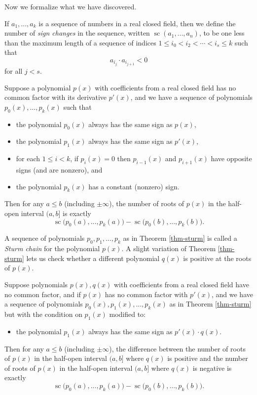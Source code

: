 Now we formalize what we have discovered.

\begin{defn} If $a_1, ..., a_k$ is a sequence of numbers in a real closed field, then we define the number of \emph{sign changes} in the sequence, written $\operatorname{sc}(a_1, ..., a_n)$, to be one less than the maximum length of a sequence of indices $1 \le i_0 < i_2 < \cdots < i_s \le k$ such that
\[
a_{i_j} \cdot a_{i_{j+1}} < 0
\]
for all $j < s$.
\end{defn}

\begin{thm}[Sturm]\label{thm-sturm} Suppose a polynomial $p(x)$ with coefficients from a real closed field has no common factor with its derivative $p'(x)$, and we have a sequence of polynomials $p_0(x), ..., p_k(x)$ such that
\begin{itemize}
\item the polynomial $p_0(x)$ always has the same sign as $p(x)$,

\item the polynomial $p_1(x)$ always has the same sign as $p'(x)$,

\item for each $1 \le i < k$, if $p_i(x) = 0$ then $p_{i-1}(x)$ and $p_{i+1}(x)$ have opposite signs (and are nonzero), and

\item the polynomial $p_k(x)$ has a constant (nonzero) sign.
\end{itemize}
Then for any $a \le b$ (including $\pm\infty$), the number of roots of $p(x)$ in the half-open interval $(a,b]$ is exactly
\[
\operatorname{sc}\big(p_0(a), ..., p_k(a)\big) - \operatorname{sc}\big(p_0(b), ..., p_k(b)\big).
\]
\end{thm}

A sequence of polynomials $p_0, p_1, ..., p_k$ as in Theorem \ref{thm-sturm} is called a \emph{Sturm chain} for the polynomial $p(x)$. A slight variation of Theorem \ref{thm-sturm} lets us check whether a different polynomial $q(x)$ is positive at the roots of $p(x)$.

\begin{thm} Suppose polynomials $p(x),q(x)$ with coefficients from a real closed field have no common factor, and if $p(x)$ has no common factor with $p'(x)$, and we have a sequence of polynomials $p_0(x), p_1(x), ..., p_k(x)$ as in Theorem \ref{thm-sturm} but with the condition on $p_1(x)$ modified to:
\begin{itemize}
\item the polynomial $p_1(x)$ always has the same sign as $p'(x) \cdot q(x)$.
\end{itemize}
Then for any $a \le b$ (including $\pm\infty$), the difference between the number of roots of $p(x)$ in the half-open interval $(a,b]$ where $q(x)$ is positive and the number of roots of $p(x)$ in the half-open interval $(a,b]$ where $q(x)$ is negative is exactly
\[
\operatorname{sc}\big(p_0(a), ..., p_k(a)\big) - \operatorname{sc}\big(p_0(b), ..., p_k(b)\big).
\]
\end{thm}

